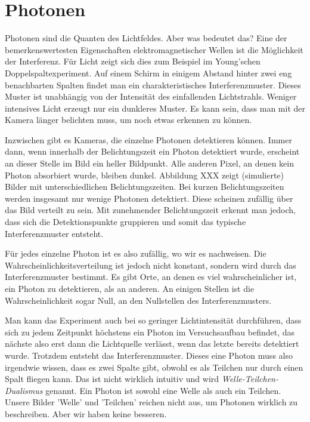  \section{Photonen}

 Photonen sind die Quanten des Lichtfeldes. Aber was bedeutet das? Eine der bemerkenswertesten Eigenschaften elektromagnetischer Wellen ist die Möglichkeit der Interferenz. Für Licht zeigt sich dies zum Beispiel im Young'schen Doppelspaltexperiment. Auf einem Schirm in einigem Abstand hinter zwei eng benachbarten Spalten findet man ein charakteristisches Interferenzmuster. Dieses Muster ist unabhängig von der Intensität des einfallenden Lichtstrahls. Weniger intensives Licht erzeugt nur ein dunkleres Muster. Es kann sein, dass man mit der Kamera länger belichten muss, um noch etwas erkennen zu können.

 Inzwischen gibt es Kameras, die einzelne Photonen detektieren können. Immer dann, wenn innerhalb der Belichtungszeit ein Photon detektiert wurde, erscheint an dieser Stelle im Bild ein heller Bildpunkt. Alle anderen Pixel, an denen kein Photon absorbiert wurde, bleiben dunkel. Abbildung XXX zeigt (simulierte) Bilder mit unterschiedlichen Belichtungszeiten. Bei kurzen Belichtungszeiten werden insgesamt nur wenige Photonen detektiert. Diese scheinen zufällig über das Bild verteilt zu sein. Mit zunehmender Belichtungszeit erkennt man jedoch, dass sich die Detektionspunkte gruppieren und somit das typische Interferenzmuster entsteht.

 Für jedes einzelne Photon ist es also zufällig, wo wir es nachweisen. Die Wahrscheinlichkeitsverteilung ist jedoch nicht konstant, sondern wird durch das Interferenzmuster bestimmt. Es gibt Orte, an denen es viel wahrscheinlicher ist, ein Photon zu detektieren, als an anderen. An einigen Stellen ist die Wahrscheinlichkeit sogar Null, an den Nullstellen des Interferenzmusters.

 Man kann das Experiment auch bei so geringer Lichtintensität durchführen, dass sich zu jedem Zeitpunkt höchstens ein Photon im Versuchsaufbau befindet, das nächste also erst dann die Lichtquelle verlässt, wenn das letzte bereits detektiert wurde. Trotzdem entsteht das Interferenzmuster. Dieses eine Photon muss also irgendwie wissen, dass es zwei Spalte gibt, obwohl es als Teilchen nur durch einen Spalt fliegen kann. Das ist nicht wirklich intuitiv und wird \emph{Welle-Teilchen-Dualismus} genannt. Ein Photon ist sowohl eine Welle als auch ein Teilchen. Unsere Bilder 'Welle' und 'Teilchen' reichen nicht aus, um Photonen wirklich zu beschreiben. Aber wir haben keine besseren.


